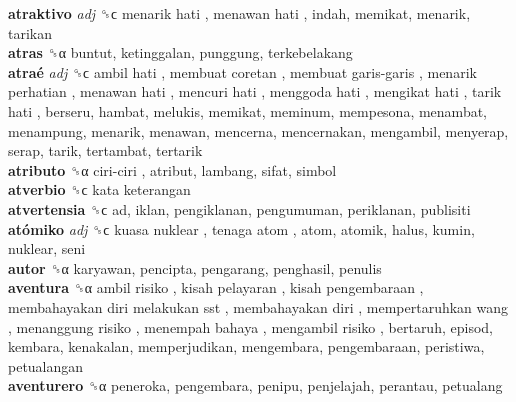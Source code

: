 \textbf{atraktivo} \emph{adj}  ␝ϲ   menarik hati ,  menawan hati , indah, memikat, menarik, tarikan  \\
\textbf{atras} ␝α  buntut, ketinggalan, punggung, terkebelakang  \\
\textbf{atraé} \emph{adj}  ␝ϲ   ambil hati ,  membuat coretan ,  membuat garis-garis ,  menarik perhatian ,  menawan hati ,  mencuri hati ,  menggoda hati ,  mengikat hati ,  tarik hati , berseru, hambat, melukis, memikat, meminum, mempesona, menambat, menampung, menarik, menawan, mencerna, mencernakan, mengambil, menyerap, serap, tarik, tertambat, tertarik  \\
\textbf{atributo} ␝α   ciri-ciri , atribut, lambang, sifat, simbol  \\
\textbf{atverbio} ␝ϲ   kata keterangan   \\
\textbf{atvertensia} ␝ϲ  ad, iklan, pengiklanan, pengumuman, periklanan, publisiti  \\
\textbf{atómiko} \emph{adj}  ␝ϲ   kuasa nuklear ,  tenaga atom , atom, atomik, halus, kumin, nuklear, seni  \\
\textbf{autor} ␝α  karyawan, pencipta, pengarang, penghasil, penulis  \\
\textbf{aventura} ␝α   ambil risiko ,  kisah pelayaran ,  kisah pengembaraan ,  membahayakan diri melakukan sst ,  membahayakan diri ,  mempertaruhkan wang ,  menanggung risiko ,  menempah bahaya ,  mengambil risiko , bertaruh, episod, kembara, kenakalan, memperjudikan, mengembara, pengembaraan, peristiwa, petualangan  \\
\textbf{aventurero} ␝α  peneroka, pengembara, penipu, penjelajah, perantau, petualang  \\
